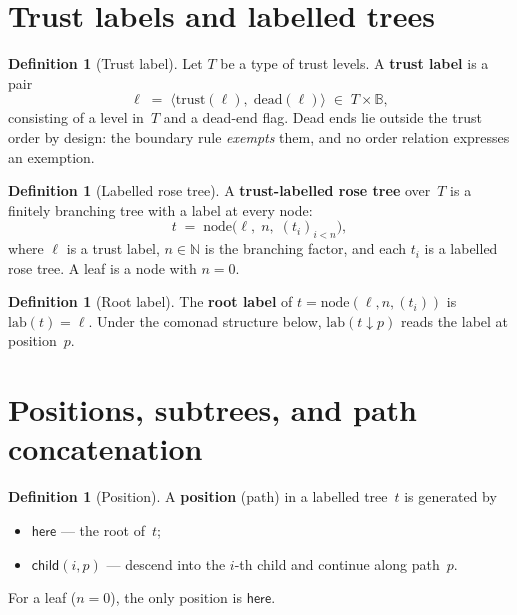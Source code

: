 \documentclass[11pt,a4paper]{article}
\theoremstyle{plain}
\theoremstyle{definition}
\newtheorem{definition}[theorem]{Definition}
\begin{document}
\section{Trust labels and labelled trees}

\begin{definition}[Trust label]\label{def:label}
Let $T$ be a type of trust levels. A \textbf{trust label} is a pair
\begin{equation}
  \ell \;=\; \langle \mathrm{trust}(\ell),\; \mathrm{dead}(\ell) \rangle
  \;\in\; T \times \mathbb{B},
\end{equation}
consisting of a level in~$T$ and a dead-end flag. Dead ends lie outside
the trust order by design: the boundary rule \emph{exempts} them, and
no order relation expresses an exemption.
\end{definition}

\begin{definition}[Labelled rose tree]\label{def:ltree}
A \textbf{trust-labelled rose tree} over~$T$ is a finitely branching tree
with a label at every node:
\begin{equation}
  t \;=\; \mathrm{node}\bigl(\ell,\; n,\; (t_i)_{i < n}\bigr),
\end{equation}
where $\ell$ is a trust label, $n \in \mathbb{N}$ is the branching
factor, and each $t_i$ is a labelled rose tree. A leaf is a node with
$n = 0$.
\end{definition}

\begin{definition}[Root label]\label{def:lab}
The \textbf{root label} of $t = \mathrm{node}(\ell, n, (t_i))$ is
$\mathrm{lab}(t) = \ell$. Under the comonad structure below,
$\mathrm{lab}(t \mathbin{\downarrow} p)$ reads the label at position~$p$.
\end{definition}

\section{Positions, subtrees, and path concatenation}

\begin{definition}[Position]\label{def:lpos}
A \textbf{position} (path) in a labelled tree~$t$ is generated by
\begin{itemize}
  \item $\mathsf{here}$ --- the root of~$t$;
  \item $\mathsf{child}(i, p)$ --- descend into the $i$-th child and
        continue along path~$p$.
\end{itemize}
For a leaf ($n = 0$), the only position is $\mathsf{here}$.
\end{definition}
\end{document}
